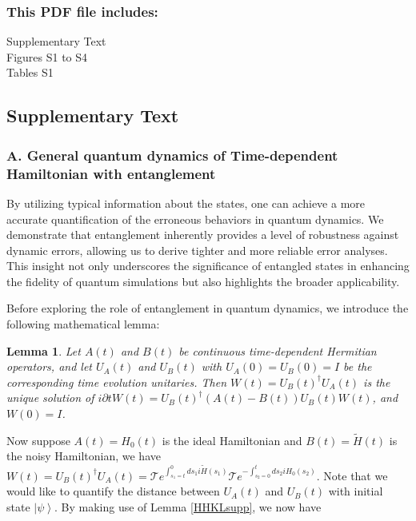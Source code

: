 \documentclass[12pt]{article}
\newtheorem{lemma}{Lemma}
\newcommand{\autoref}[1]{\ref{#1}}
\newcommand{\ket}[1]{\left|#1\right\rangle}
\begin{document}
\subsubsection*{This PDF file includes:}
Supplementary Text\\
Figures S1 to S4\\
Tables S1

\newpage

\subsection*{Supplementary Text}

\subsubsection*{A. General quantum dynamics of Time-dependent Hamiltonian with entanglement} \label{timedependent}



By utilizing typical information about the states, one can achieve a more accurate quantification of the erroneous behaviors in quantum dynamics. 
We demonstrate that entanglement inherently provides a level of robustness against dynamic errors, allowing us to derive tighter and more reliable error analyses.
This insight not only underscores the significance of entangled states in enhancing the fidelity of quantum simulations but also highlights the broader applicability. 


Before exploring the role of entanglement in quantum dynamics, we introduce the following mathematical lemma:
\begin{lemma}     \label{HHKL}\cite{HHKL8555119}
    Let $A(t)$ and $B(t)$ be continuous time-dependent Hermitian operators, and let $U_A(t)$ and $U_B(t)$  with $U_A(0) = U_B(0) = I$ be the corresponding time evolution unitaries. 
    Then $W(t)=U_B(t)^\dagger U_A(t)$ is the unique solution of $ i \partial t W(t) =U_B (t)^\dagger (A(t)-B(t))U_B(t ) W(t)$, and $W(0)=I$.
\end{lemma}


Now suppose $A(t)=H_0(t)$ is the ideal Hamiltonian and $B(t)=\widetilde{H}(t)$ is the noisy Hamiltonian, we have $W(t)=U_{B}(t)^\dagger U_A(t)=\mathcal{T}e^{\int_{s_1=t}^{0}ds_1i\widetilde{H}(s_1)} \mathcal{T}e^{-\int_{s_2=0}^{t}d{s_2}iH_0(s_2)}$. Note that we would like to quantify the distance between $U_A(t)$ and $U_B(t)$ with initial state $\ket{\psi}$. By making use of Lemma \autoref{HHKLsupp}, we now have
\end{document}
